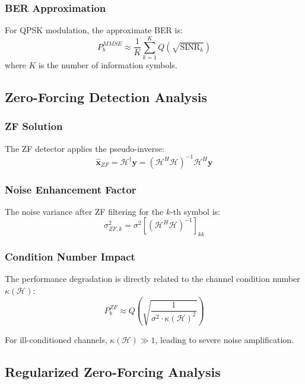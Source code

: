 \subsubsection{BER Approximation}
For QPSK modulation, the approximate BER is:
\begin{equation}
P_b^{MMSE} \approx \frac{1}{K}\sum_{k=1}^{K} Q\left(\sqrt{\text{SINR}_k}\right)
\end{equation}
where $K$ is the number of information symbols.

\subsection{Zero-Forcing Detection Analysis}

\subsubsection{ZF Solution}
The ZF detector applies the pseudo-inverse:
\begin{equation}
\hat{\mathbf{x}}_{ZF} = \mathcal{H}^{\dagger}\mathbf{y} = (\mathcal{H}^H\mathcal{H})^{-1}\mathcal{H}^H\mathbf{y}
\end{equation}

\subsubsection{Noise Enhancement Factor}
The noise variance after ZF filtering for the $k$-th symbol is:
\begin{equation}
\sigma_{ZF,k}^2 = \sigma^2\left[(\mathcal{H}^H\mathcal{H})^{-1}\right]_{kk}
\end{equation}

\subsubsection{Condition Number Impact}
The performance degradation is directly related to the channel condition number $\kappa(\mathcal{H})$:
\begin{equation}
P_b^{ZF} \approx Q\left(\sqrt{\frac{1}{\sigma^2 \cdot \kappa(\mathcal{H})^2}}\right)
\end{equation}

For ill-conditioned channels, $\kappa(\mathcal{H}) \gg 1$, leading to severe noise amplification.

\subsection{Regularized Zero-Forcing Analysis}

